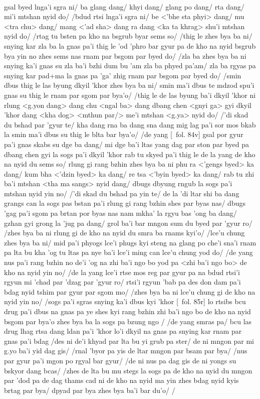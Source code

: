 \documentclass[12pt]{article}
\begin{document}
\textbf{\TVB}\\
gsal byed lnga'i sgra ni/ ba glang dang/ khyi dang/ glang po dang/ rta dang/ mi'i mtshan nyid do/ /bdud rtsi lnga'i sgra ni/ be <'bhe sta phyi> dang/ mu <tra chu> dang/ mang <'ad sha> dang ra dang <ka ta khrag> shu'i mtshan nyid do/ /rtag tu bsten pa kho na bsgrub byar sems so/ /thig le zhes bya ba ni/ snying kar zla ba la gnas pa'i thig le 'od 'phro bar gyur pa de kho na nyid bsgrub bya yin no zhes sems nas rnam par bsgom par byed do/ /zla ba zhes bya ba ni snying ka'i gnas su zla ba'i bzhi dum bu 'am zla ba phyed pa'am/ zla ba rgyas pa snying kar pad+ma la gnas pa 'ga' zhig rnam par bsgom par byed do/ /smin dbus thig le las byung dkyil 'khor zhes bya ba ni/ smin ma'i dbus te mdzod spu'i gnas su thig le rnam par sgom par bya'o/ /thig le de las byung ba'i dkyil 'khor ni rlung <g.yon dang> dang chu <ngal ba> dang dbang chen <gnyi ga> gyi dkyil 'khor dang <kha dog> <mthun par/> me'i mtshan <g.ya> nyid do/ /'di skad du bshad par 'gyur te/ kha dang rna ba dang sna dang mig lag pa'i sor mos bkab la smin ma'i dbus su thig le blta bar bya'o/ /de yang [\TVB\ fol. 84v] gsal por gyur pa'i gnas skabs su dge ba dang/ mi dge ba'i ltas yang dag par ston par byed pa dbang chen gyi la sogs pa'i dkyil 'khor rab tu skyed pa'i thig le de la yang de kho na nyid du sems so/ rlung gi rang bzhin zhes bya ba ni phu ra <'gengs byed> ka dang/ kum bha <'dzin byed> ka dang/ re tsa <'byin byed> ka dang/ rab tu zhi ba'i mtshan <tha ma sangs> nyid dang/ dbugs dbyung rngub la sogs pa'i mtshan nyid yin no/ /'di skad du bshad pa yin te/ de la 'di ltar shi ba dang grangs can la sogs pas bstan pa'i rlung gi rang bzhin shes par byas nas/ dbugs 'gag pa'i sgom pa brtan por byas nas nam mkha' la rgyu bas 'ong ba dang/ gzhan gyi grong la 'jug pa dang/ grol ba'i bar mngon sum du byed par 'gyur ro/ /zhes bya ba ni rlung gi de kho na nyid du smra ba rnams kyi'o/ /lce'u chung zhes bya ba ni/ mid pa'i phyogs lce'i phugs kyi steng na glang po che'i sna'i rnam pa lta bu kha 'og tu ltas pa nye ba'i lce'i ming can lce'u chung yod do/ /de yang nus pa'i rang bzhin no de'i 'og na zhi ba'i ngo bo yod pa <zhi ba'i ngo bo> de kho na nyid yin no/ /de la yang lce'i rtse mos reg par gyur pa na bdud rtsi'i rgyun mi 'chad par 'dzag par 'gyur ro/ rtsi'i rgyun 'bab pa des don dam pa'i bdag nyid tshim par gyur par sgom mo/ /zhes bya ba ni lce'u chung gi de kho na nyid yin no/ /sogs pa'i sgras snying ka'i dbus kyi 'khor [\TVB\ fol. 85r] lo rtsibs bcu drug pa'i dbus na gnas pa ye shes kyi rang bzhin zhi ba'i ngo bo de kho na nyid bsgom par bya'o zhes bya ba la sogs pa bzung ngo / /de yang smras pa/ bcu las drug lhag rtsa dang ldan pa'i 'khor lo'i dkyil na gnas pa snying kar rnam par gnas pa'i bdag /des ni de'i khyad par lta bu yi grub pa ster/ de ni mngon par mi g.yo ba'i yid dag gis/ /rnal 'byor pa yis de ltar mngon par bsam par bya/ /nus par gyur pa'i mgon po rgyal bar gyur/ /de ni nus pa dag gis de ni yongs su bskyor dang bcas/ /zhes de lta bu mu stegs la sogs pa de kho na nyid du mngon par 'dod pa de dag thams cad ni de kho na nyid ma yin zhes bdag nyid kyis brtag par bya/ dpyad par bya zhes bya ba'i bar du'o/ /
\end{document}
